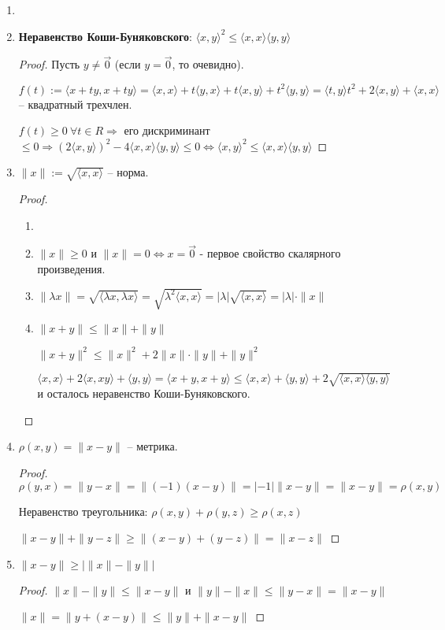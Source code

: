 \begin{proper}
    \begin{enumerate}
        \item[]
        \item \textbf{Неравенство Коши-Буняковского}: $\langle x,y\rangle^2\leq \langle x,x\rangle\langle y,y\rangle$
        \begin{proof}
            Пусть $y\neq \vec{0}$ (если $y=\vec{0}$, то очевидно).

            $f(t):=\langle x+ty,x+ty\rangle=\langle x,x\rangle+t\langle y,x\rangle+t\langle x,y\rangle+t^2\langle y,y\rangle=\langle t,y\rangle t^2+2\langle x,y\rangle+\langle x,x\rangle$ – квадратный трехчлен.

            $f(t)\geq 0\ \forall t\in R\Rightarrow$ его дискриминант $\leq 0\Rightarrow (2\langle x,y\rangle)^2-4\langle x,x\rangle\langle y,y\rangle\leq 0\Leftrightarrow \langle x,y\rangle^2\leq \langle x,x\rangle\langle y,y\rangle$
        \end{proof}
        \item $\|x\|:=\sqrt{\langle x,x\rangle}$ – норма.
        \begin{proof}
            \begin{enumerate}
                \item[]
                \item $\|x\|\geq 0$ и $\|x\|=0\Leftrightarrow x=\vec{0}$ - первое свойство скалярного произведения.
                \item $\|\lambda x\|=\sqrt{\langle\lambda x,\lambda x\rangle}=\sqrt{\lambda^2\langle x,x\rangle}=|\lambda|\sqrt{\langle x,x\rangle}=|\lambda|\cdot \|x\|$
                \item $\|x+y\|\leq \|x\|+\|y\|$

                $\|x+y\|^2\leq \|x\|^2+2\|x\|\cdot \|y\|+\|y\|^2$

                $\langle x,x\rangle+2\langle x,x
                y\rangle+\langle y,y\rangle=\langle x+y,x+y\rangle\leq \langle x,x\rangle+\langle y,y\rangle+2\sqrt{\langle x,x\rangle\langle y,y\rangle}$ и осталось неравенство Коши-Буняковского.
            \end{enumerate}
        \end{proof}
        \item $\rho(x,y)=\|x-y\|$ – метрика.
        \begin{proof}
            $\rho(y,x)=\|y-x\|=\|(-1)(x-y)\|=|-1|\|x-y\|=\|x-y\|=\rho(x,y)$

            Неравенство треугольника: $\rho(x,y)+\rho(y,z)\geq \rho(x,z)$

            $\|x-y\|+\|y-z\|\geq \|(x-y)+(y-z)\|=\|x-z\|$
        \end{proof}
        \item $\|x-y\|\geq |\|x\|-\|y\||$

        \begin{proof}
            $\|x\|-\|y\|\leq \|x-y\|$ и $\|y\|-\|x\|\leq \|y-x\|=\|x-y\|$

            $\|x\|=\|y+(x-y)\|\leq \|y\|+\|x-y\|$
        \end{proof}
    \end{enumerate}
\end{proper}

